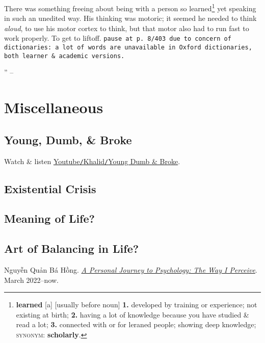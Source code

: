 \documentclass[oneside]{book}
\numberwithin{equation}{section}
\begin{document}
There was something freeing about being with a person so learned\footnote{\textbf{learned} [a] [usually before noun] \textbf{1.} developed by training or experience; not existing at birth; \textbf{2.} having a lot of knowledge because you have studied \& read a lot; \textbf{3.} connected with or for leraned people; showing deep knowledge; \textsc{synonym}: \textbf{scholarly}.} yet speaking in such an unedited way. His thinking was motoric; it seemed he needed to think \textit{aloud}, to use his motor cortex to think, but that motor also had to run fast to work properly. To get to liftoff. \texttt{pause at p. 8/403 due to concern of dictionaries: a lot of words are unavailable in Oxford dictionaries, both learner \& academic versions.}

'' -- \cite[Foreword]{Peterson2018}


\chapter{Miscellaneous}

\section{Young, Dumb, \& Broke}
Watch \& listen \href{https://www.youtube.com/watch?v=IPfJnp1guPc}{Youtube\texttt{/}Khalid\texttt{/}Young Dumb \& Broke}.

\section{Existential Crisis}

\section{Meaning of Life?}

\section{Art of Balancing in Life?}



\begin{thebibliography}{99}
	  Nguyễn Quản Bá Hồng. \href{https://github.com/NQBH/hobby/blob/master/psychology/NQBH_a_personal_journey_to_psychology.pdf}{\textit{A Personal Journey to Psychology: The Way I Perceive}}. March 2022--now.
\end{thebibliography}


\printbibliography[heading=bibintoc]
	
\end{document}
